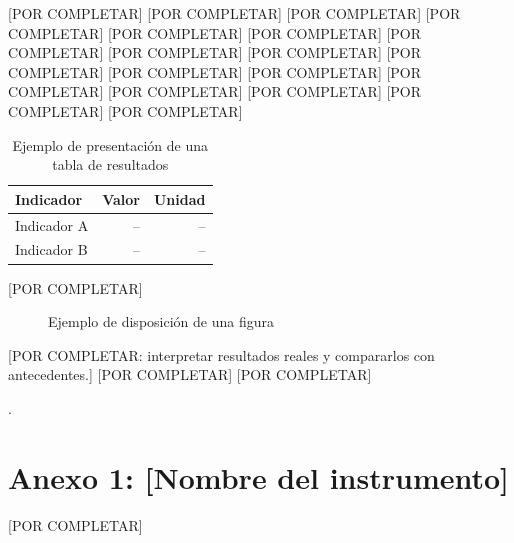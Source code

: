 \documentclass[12pt,a4paper,oneside]{report}
\begin{document}
[POR COMPLETAR]
[POR COMPLETAR]
[POR COMPLETAR]
[POR COMPLETAR]
[POR COMPLETAR]
[POR COMPLETAR]
[POR COMPLETAR]
[POR COMPLETAR]
[POR COMPLETAR]
[POR COMPLETAR]
[POR COMPLETAR]
[POR COMPLETAR]
[POR COMPLETAR]
[POR COMPLETAR]
[POR COMPLETAR]
[POR COMPLETAR]
[POR COMPLETAR]
\begin{table}[htbp]
\caption{Ejemplo de presentación de una tabla de resultados}\label{tab:ejemplo}
\noindent\begin{tabularx}{\linewidth}{@{}Xrr@{}}\toprule
Indicador & Valor & Unidad\\\midrule
Indicador A & -- & --\\
Indicador B & -- & --\\\bottomrule
\end{tabularx}
\end{table}
[POR COMPLETAR]
\begin{figure}[htbp]
\caption{Ejemplo de disposición de una figura}\label{fig:ejemplo}
\centering{}\par
{}
\end{figure}
[POR COMPLETAR: interpretar resultados reales y compararlos con antecedentes.]
[POR COMPLETAR]
[POR COMPLETAR]
\clearpage{}
\begin{list}{}{\setlength{\leftmargin}{1.27cm}\setlength{\itemindent}{-1.27cm}\setlength{\itemsep}{6pt}\setlength{\parsep}{0pt}}
\item [POR COMPLETAR: referencias verificadas].
\end{list}
\clearpage{}
\section*{Anexo 1: [Nombre del instrumento]}
[POR COMPLETAR]
\end{document}

